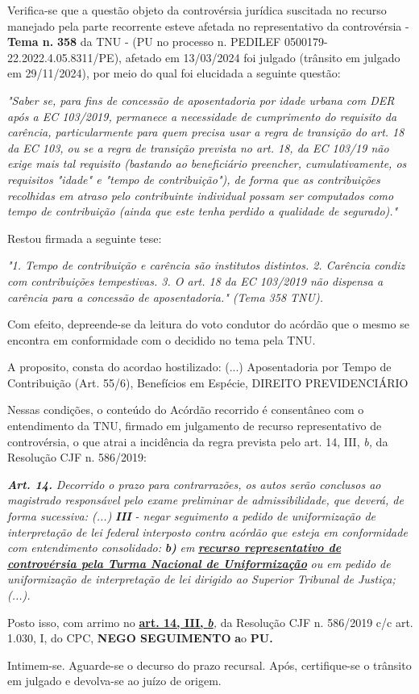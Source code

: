 \documentclass[12pt]{article}
\begin{document}
\justifying
\noindent Verifica-se que a questão objeto da controvérsia jurídica suscitada no recurso manejado pela parte recorrente esteve afetada no representativo da controvérsia - \textbf{Tema n. }\textbf{358} da TNU - (PU no processo n. PEDILEF 0500179-22.2022.4.05.8311/PE),  afetado em 13/03/2024 foi julgado (trânsito em julgado em 29/11/2024), por meio do qual foi elucidada a seguinte questão:

\noindent \textit{"Saber se, para fins de concessão de aposentadoria por idade urbana com DER após a EC 103/2019, permanece a necessidade de cumprimento do requisito da carência, particularmente para quem precisa usar a regra de transição do art. 18 da EC 103, ou se a regra de transição prevista no art. 18, da EC 103/19 não exige mais tal requisito (bastando ao beneficiário preencher, cumulativamente, os requisitos "idade" e "tempo de contribuição"), de forma que as contribuições recolhidas em atraso pelo contribuinte individual possam ser computados como tempo de contribuição (ainda que este tenha perdido a qualidade de segurado)."}

\noindent Restou firmada a seguinte tese:

\noindent \textit{"1. Tempo de contribuição e carência são institutos distintos. 2. Carência condiz com contribuições tempestivas. 3. O art. 18 da EC 103/2019 não dispensa a carência para a concessão de aposentadoria." (Tema 358 TNU).}

\noindent Com efeito, depreende-se da leitura do voto condutor do acórdão que o mesmo se encontra em conformidade com o decidido no  tema pela TNU.

\noindent A proposito, consta do acordao hostilizado: (...) Aposentadoria por Tempo de Contribuição (Art. 55/6), Benefícios em Espécie, DIREITO PREVIDENCIÁRIO

\noindent Nessas condições, o conteúdo do Acórdão recorrido é consentâneo com o entendimento da TNU, firmado em julgamento de recurso representativo de controvérsia, o que atrai a incidência da regra prevista pelo art. 14, III, \textit{b,} da Resolução CJF n. 586/2019:

\noindent \textit{\textbf{Art. 14.}}\textit{ Decorrido o prazo para contrarrazões, os autos serão conclusos ao magistrado responsável pelo exame preliminar de admissibilidade, que deverá, de forma sucessiva: (...) }\textit{\textbf{III }}\textit{- negar seguimento a pedido de uniformização de interpretação de lei federal interposto contra acórdão que esteja em conformidade com entendimento consolidado: }\textit{\textbf{b)}}\textit{ em }\uline{\textit{\textbf{recurso representativo de controvérsia pela Turma Nacional de Uniformização}}}\textit{ ou em pedido de uniformização de interpretação de lei dirigido ao Superior Tribunal de Justiça;(...).}

\noindent Posto isso, com arrimo no \uline{\textbf{art. 14, III, }}\uline{\textit{\textbf{b}}}\textit{,} da Resolução CJF n. 586/2019 c/c art. 1.030, I, do CPC, \textbf{NEGO SEGUIMENTO }\textbf{a}o\textbf{ PU}\textbf{.}

\noindent Intimem-se. Aguarde-se o decurso do prazo recursal. Após, certifique-se o trânsito em julgado e devolva-se ao juízo de origem.
\end{document}
